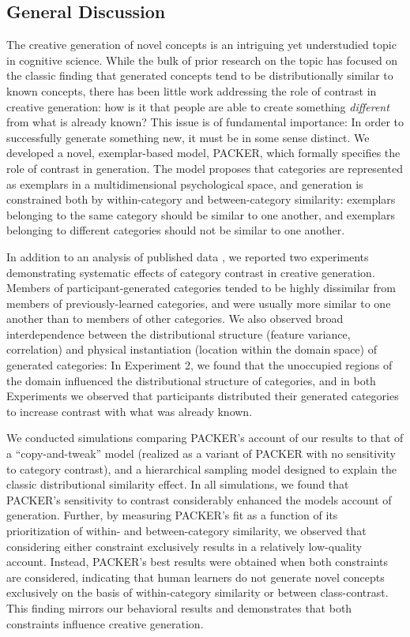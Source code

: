 \documentclass[12pt]{article}
\begin{document}
\begin{flushleft}
\section{General Discussion}

The creative generation of novel concepts is an intriguing yet understudied topic in cognitive science. While the bulk of prior research on the topic has focused on the classic finding that generated concepts tend to be distributionally similar to known concepts, there has been little work addressing the role of contrast in creative generation: how is it that people are able to create something {\em different} from what is already known? This issue is of fundamental importance: In order to successfully generate something new, it must be in some sense distinct. We developed a novel, exemplar-based model, PACKER, which formally specifies the role of contrast in generation. The model proposes that categories are represented as exemplars in a multidimensional psychological space, and generation is constrained both by within-category and between-category similarity: exemplars belonging to the same category should be similar to one another, and exemplars belonging to different categories should not be similar to one another. 

In addition to an analysis of published data \citep[][Experiment 3]{jern2013probabilistic}, we reported two experiments demonstrating systematic effects of category contrast in creative generation. Members of participant-generated categories tended to be highly dissimilar from members of previously-learned categories, and were usually more similar to one another than to members of other categories. We also observed broad interdependence between the distributional structure (feature variance, correlation) and physical instantiation (location within the domain space) of generated categories: In Experiment 2, we found that the unoccupied regions of the domain influenced the distributional structure of categories, and in both Experiments we observed that participants distributed their generated categories to increase contrast with what was already known. 

We conducted simulations comparing PACKER's account of our results to that of a ``copy-and-tweak'' model (realized as a variant of PACKER with no sensitivity to category contrast), and a hierarchical sampling model designed to explain the classic distributional similarity effect. In all simulations, we found that PACKER's sensitivity to contrast considerably enhanced the models account of generation. Further, by measuring PACKER's fit as a function of its prioritization of within- and between-category similarity, we observed that considering either constraint exclusively results in a relatively low-quality account. Instead, PACKER's best results were obtained when both constraints are considered, indicating that human learners do not generate novel concepts exclusively on the basis of within-category similarity or between class-contrast. This finding mirrors our behavioral results and demonstrates that both constraints influence creative generation. 


\end{flushleft}
\end{document}
